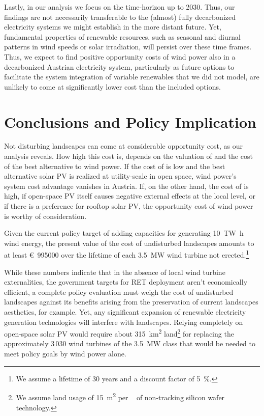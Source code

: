 \documentclass[review, 3p, times, 12pt, authoryear]{elsarticle}
\begin{document}
    Lastly, in our analysis we focus on the time-horizon up to 2030.
    Thus, our findings are not necessarily transferable to the (almost) fully decarbonized electricity systems we might establish in the more distant future.
    Yet, fundamental properties of renewable resources, such as seasonal and diurnal patterns in wind speeds or solar irradiation, will persist over these time frames.
    Thus, we expect to find positive opportunity costs of wind power also in a decarbonized Austrian electricity system, particularly as future options to facilitate the system integration of variable renewables that we did not model, are unlikely to come at significantly lower cost than the included options.


    \section{Conclusions and Policy Implication} \label{sec:conclusions-policy-implication}
    Not disturbing landscapes can come at considerable opportunity cost, as our analysis reveals.
    How high this cost is, depends on the valuation of  and the cost of the best alternative to wind power.
    If the cost of  is low and the best alternative solar PV is realized at utility-scale in open space, wind power's system cost advantage vanishes in Austria.
    If, on the other hand, the cost of  is high, if open-space PV itself causes negative external effects at the local level, or if there is a preference for rooftop solar PV, the opportunity cost of wind power is worthy of consideration.

    Given the current policy target of adding capacities for generating \SI{10}{\tera\watt\hour} wind energy, the present value of the cost of undisturbed landscapes amounts to at least \SI{995000}[\euro]{} over the lifetime of each \SI{3.5}{\mega\watt} wind turbine not erected.\footnote{We assume a lifetime of 30 years and a discount factor of \SI{5}{\percent}.}

    While these numbers indicate that in the absence of local wind turbine externalities, the government targets for RET deployment aren't economically efficient, a complete policy evaluation must weigh the cost of undisturbed landscapes against its benefits arising from the preservation of current landscapes aesthetics, for example.
    Yet, any significant expansion of renewable electricity generation technologies will interfere with landscapes.
    Relying completely on open-space solar PV would require about \SI{315}{\square\kilo\meter} land\footnote{We assume land usage of \SI{15}{\square\meter} per \si{\kilo\wattpeak} of non-tracking silicon wafer technology.}
    for replacing the approximately 3\,030 wind turbines of the \SI{3.5}{\mega\watt} class that would be needed to meet policy goals by wind power alone.
\end{document}
